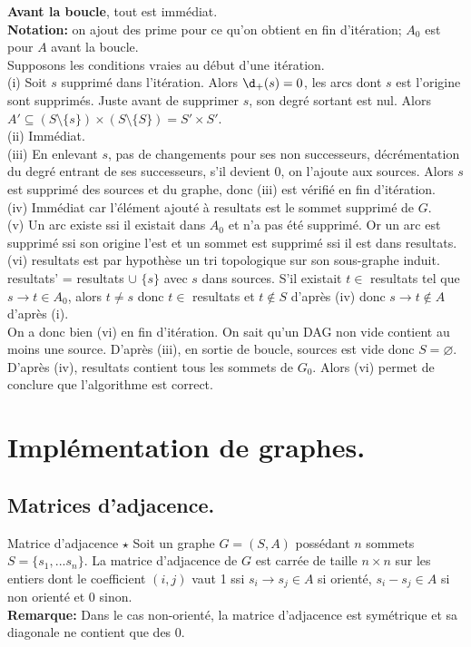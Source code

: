 \documentclass[french, 11pt]{article}
\begin{document}
\begin{prop}{}{}
\begin{itemize}[topsep=0pt,itemsep=-0.9 ex]
    \end{itemize}\vspace{0.2cm}
    \textbf{Avant la boucle}, tout est immédiat.\\
    \textbf{Notation:} on ajout des prime pour ce qu'on obtient en fin d'itération; $A_0$ est pour $A$ avant la boucle.\\
    Supposons les conditions vraies au début d'une itération.\\
    (i) Soit $s$ supprimé dans l'itération. Alors $\d_+(s)=0$, les arcs dont $s$ est l'origine sont supprimés. Juste avant de supprimer $s$, son degré sortant est nul. Alors $A'\subseteq(S\setminus\{s\})\times(S\setminus\{S\})=S'\times S'$.\\
    (ii) Immédiat.\\
    (iii) En enlevant $s$, pas de changements pour ses non successeurs, décrémentation du degré entrant de ses successeurs, s'il devient 0, on l'ajoute aux sources. Alors $s$ est supprimé des sources et du graphe, donc (iii) est vérifié en fin d'itération.\\
    (iv) Immédiat car l'élément ajouté à resultats est le sommet supprimé de $G$.\\
    (v) Un arc existe ssi il existait dans $A_0$ et n'a pas été supprimé. Or un arc est supprimé ssi son origine l'est et un sommet est supprimé ssi il est dans resultats.\\
    (vi) resultats est par hypothèse un tri topologique sur son sous-graphe induit. resultats' = resultats $\cup$ $\{s\}$ avec $s$ dans sources. S'il existait $t\in$ resultats tel que $s\to t\in A_0$, alors $t\neq s$ donc $t\in$ resultats et $t\notin S$ d'après (iv) donc $s\to t\notin A$ d'après (i).\\
    On a donc bien (vi) en fin d'itération. On sait qu'un DAG non vide contient au moins une source. D'après (iii), en sortie de boucle, sources est vide donc $S=\varnothing$. D'après (iv), resultats contient tous les sommets de $G_0$. Alors (vi) permet de conclure que l'algorithme est correct.
\end{prop}

\section{Implémentation de graphes.}

\subsection{Matrices d'adjacence.}
\begin{defi}{Matrice d'adjacence $\star$}{}
    Soit un graphe $G=(S,A)$ possédant $n$ sommets $S=\{s_1,...s_n\}$. La matrice d'adjacence de $G$ est carrée de taille $n\times n$ sur les entiers dont le coefficient $(i,j)$ vaut 1 ssi $s_i\to s_j\in A$ si orienté, $s_i-s_j\in A$ si non orienté et 0 sinon.\\
    \textbf{Remarque:} Dans le cas non-orienté, la matrice d'adjacence est symétrique et sa diagonale ne contient que des 0.  
\end{defi}
\end{document}
